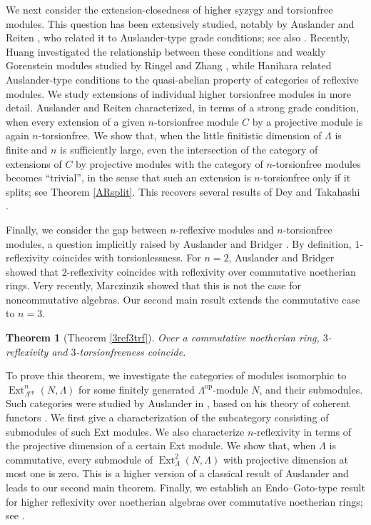 \documentclass{amsart}
\newtheorem{thm}{Theorem}[section]
\theoremstyle{definition}
\theoremstyle{remark}
\numberwithin{equation}{thm}
\def\Ext{\operatorname{Ext}}
\begin{document}
We next consider the extension-closedness of higher syzygy and torsionfree modules. This question has been extensively studied, notably by Auslander and Reiten \cite{AR1,AR2}, who related it to Auslander-type grade conditions; see also \cite{Huang99,HI,GT,DT}. Recently, Huang \cite{Hu24} investigated the relationship between these conditions and weakly Gorenstein modules studied by Ringel and Zhang \cite{RZ1,RZ2}, while Hanihara \cite{Han} related Auslander-type conditions to the quasi-abelian property of categories of reflexive modules.
We study extensions of individual higher torsionfree modules in more detail. Auslander and Reiten \cite{AR2} characterized, in terms of a strong grade condition, when every extension of a given $n$-torsionfree module $C$ by a projective module is again $n$-torsionfree. We show that, when the little finitistic dimension of $\Lambda$ is finite and $n$ is sufficiently large, even the intersection of the category of extensions of $C$ by projective modules with the category of $n$-torsionfree modules becomes ``trivial'', in the sense that such an extension is $n$-torsionfree only if it splits; see Theorem \ref{ARsplit}. This recovers several results of Dey and Takahashi \cite{DT}.

Finally, we consider the gap between $n$-reflexive modules and $n$-torsionfree modules, a question implicitly raised by Auslander and Bridger \cite{AB}. By definition, $1$-reflexivity coincides with torsionlessness. For $n=2$, Auslander and Bridger showed that $2$-reflexivity coincides with reflexivity over commutative noetherian rings. Very recently, Marczinzik \cite{Marc} showed that this is not the case for noncommutative algebras. Our second main result extends the commutative case to $n=3$.

\begin{thm}[Theorem \ref{3ref3trf}]\label{Main2}
Over a commutative noetherian ring, $3$-reflexivity and $3$-torsionfreeness coincide.
\end{thm}

To prove this theorem, we investigate the categories of modules isomorphic to $\Ext^n_{\Lambda^{\mathrm{op}}}(N,\Lambda)$ for some finitely generated $\Lambda^{\mathrm{op}}$-module $N$, and their submodules. Such categories were studied by Auslander in \cite{Aus69}, based on his theory of coherent functors \cite{AusC}. We first give a characterization of the subcategory consisting of submodules of such Ext modules. We also characterize $n$-reflexivity in terms of the projective dimension of a certain Ext module. We show that, when $\Lambda$ is commutative, every submodule of $\Ext^2_\Lambda(N,\Lambda)$ with projective dimension at most one is zero. This is a higher version of a classical result of Auslander \cite[Corollary 3.6]{Aus69} and leads to our second main theorem. Finally, we establish an Endo--Goto-type result for higher reflexivity over noetherian algebras over commutative noetherian rings; see \cite{EGref}.
\end{document}
